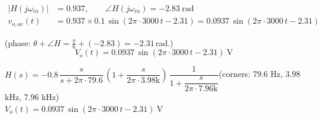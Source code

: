\documentclass[11pt]{article}
\begin{document}
\begin{align*}
|H(j\omega_{in})| &= 0.937, \qquad \angle H(j\omega_{in}) = -2.83\ \mathrm{rad} \\
v_{o,ac}(t) &= 0.937\times 0.1\,\sin\left(2\pi\cdot 3000\,t - 2.31\right) = 0.0937\,\sin\left(2\pi\cdot 3000\,t - 2.31\right)
\end{align*}

(phase: $\theta + \angle H = \frac{\pi}{6} + (-2.83) = -2.31$\,rad.)
\[
\boxed{V_o(t) = 0.0937\,\sin\left(2\pi\cdot 3000\,t - 2.31\right)\ \mathrm{V}}
\]

\begin{ansbox}
$H(s) = -0.8\,\dfrac{s}{s+2\pi\cdot 79.6}\,\left(1+\dfrac{s}{2\pi\cdot 3.98\mathrm{k}}\right)\,\dfrac{1}{1+\dfrac{s}{2\pi\cdot 7.96\mathrm{k}}}$\quad (corners: 79.6 Hz, 3.98 kHz, 7.96 kHz)\\[4pt]
$V_o(t) = 0.0937\,\sin\left(2\pi\cdot 3000\,t - 2.31\right)\ \mathrm{V}$
\end{ansbox}
\end{document}
